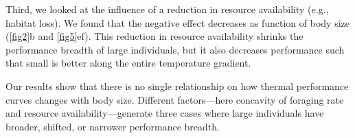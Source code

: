 Third, we looked at the influence of a reduction in resource availability (e.g., habitat loss).
We found that the negative effect decreases as function of body size (\cref{fig2}b and \cref{fig5}ef).
This reduction in resource availability shrinks the performance breadth of large individuals, but it also decreases performance such that small is better along the entire temperature gradient.


Our results show that there is no single relationship on how thermal performance curves changes with body size.
Different factors---here concavity of foraging  rate and resource availability---generate three cases where large individuals have broader, shifted, or narrower performance breadth.
